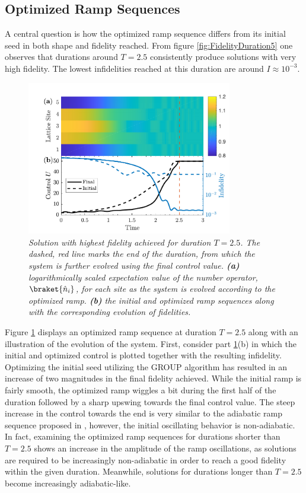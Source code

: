 \subsection{Optimized Ramp Sequences}
A central question is how the optimized ramp sequence differs from its initial seed in both shape and fidelity reached. From figure \ref{fig:FidelityDuration5} one observes that durations around $T = 2.5$ consistently produce solutions with very high fidelity. The lowest infidelities reached at this duration are around $I \approx 10^{-3}$. 
\begin{figure}[h!]
    \centering
    \includegraphics[width=0.8\textwidth]{Figures/5part/ExtendedRampT25.pdf}
    \caption{\textit{Solution with highest fidelity achieved for duration $T = 2.5$. The dashed, red line marks the end of the duration, from which the system is further evolved using the final control value. \textbf{(a)} logarithmically scaled expectation value of the number operator, $\braket{\hat{n}_i}$, for each site as the system is evolved according to the optimized ramp. \textbf{(b)} the initial and optimized ramp sequences along with the corresponding evolution of fidelities.}}
    \label{fig:ExtendedRamp5}
\end{figure}
Figure \ref{fig:ExtendedRamp5} displays an optimized ramp sequence at duration $T = 2.5$ along with an illustration of the evolution of the system. First, consider part \ref{fig:ExtendedRamp5}(b) in which the initial and optimized control is plotted together with the resulting infidelity. Optimizing the initial seed utilizing the GROUP algorithm has resulted in an increase of two magnitudes in the final fidelity achieved.
While the initial ramp is fairly smooth, the optimized ramp wiggles a bit during the first half of the duration followed by a sharp upswing towards the final control value. The steep increase in the control towards the end is very similar to the adiabatic ramp sequence proposed in \cite{Zakrzewski2009}, however, the initial oscillating behavior is non-adiabatic. In fact, examining the optimized ramp sequences for durations shorter than $T = 2.5$ shows an increase in the amplitude of the ramp oscillations, as solutions are required to be increasingly non-adiabatic in order to reach a good fidelity within the given duration. Meanwhile, solutions for durations longer than $T = 2.5$ become increasingly adiabatic-like.\\
